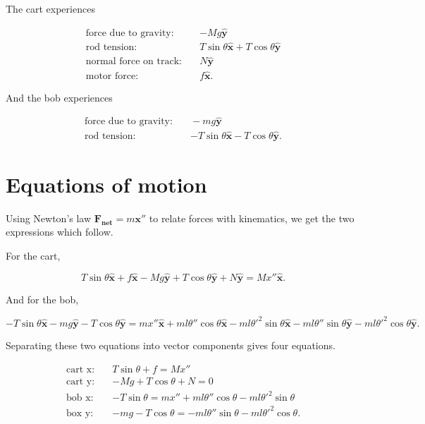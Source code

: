 \documentclass[12pt]{article}
\begin{document}
The cart experiences

\begin{align}
\mbox{force due to gravity:} &\quad {-M} g \mathbf{\hat{y}} \nonumber\\[5pt]
\mbox{rod tension:} &\quad T \sin{\theta} \mathbf{\hat{x}} + T \cos{\theta} \mathbf{\hat{y}} \nonumber\\[5pt]
\mbox{normal force on track:} &\quad N \mathbf{\hat{y}} \nonumber\\[5pt]
\mbox{motor force:} &\quad f \mathbf{\hat{x}}. \nonumber
\end{align}

And the bob experiences

\begin{align}
\mbox{force due to gravity:} &\quad -m g \mathbf{\hat{y}} \nonumber\\[5pt]
\mbox{rod tension:} &\quad {-T} \sin{\theta} \mathbf{\hat{x}} - T \cos{\theta} \mathbf{\hat{y}}. \nonumber
\end{align}

\section{Equations of motion}

Using Newton's law $\mathbf{F_{net}} = m \mathbf{x''}$ to relate forces with kinematics, we get the two expressions which follow.

For the cart,

\begin{equation}
T \sin{\theta} \mathbf{\hat{x}} + f \mathbf{\hat{x}} - M g \mathbf{\hat{y}} + T \cos{\theta} \mathbf{\hat{y}} + N \mathbf{\hat{y}} = M x'' \mathbf{\hat{x}}.
\end{equation}

And for the bob,

\begin{equation}
-T \sin{\theta} \mathbf{\hat{x}} - m g \mathbf{\hat{y}} - T \cos{\theta} \mathbf{\hat{y}} = m x'' \mathbf{\hat{x}} + m l \theta'' \cos{\theta} \mathbf{\hat{x}} - m l \theta'^2 \sin{\theta} \mathbf{\hat{x}} - m l \theta'' \sin{\theta} \mathbf{\hat{y}} - m l \theta'^2 \cos{\theta} \mathbf{\hat{y}}.
\end{equation}

Separating these two equations into vector components gives four equations.

\begin{align}
\label{eq:a} \mbox{cart x:} &\quad T \sin{\theta} + f = M x'' \\[5pt]
\mbox{cart y:} &\quad {-M} g + T \cos{\theta} + N = 0 \\[5pt]
\label{eq:b} \mbox{bob x:} &\quad {-T} \sin{\theta} = m x'' + m l \theta'' \cos{\theta} - m l \theta'^2 \sin{\theta} \\[5pt]
\label{eq:c} \mbox{box y:} &\quad {-m} g - T \cos{\theta} = -m l \theta'' \sin{\theta} - m l \theta'^2 \cos{\theta}.
\end{align}
\end{document}
